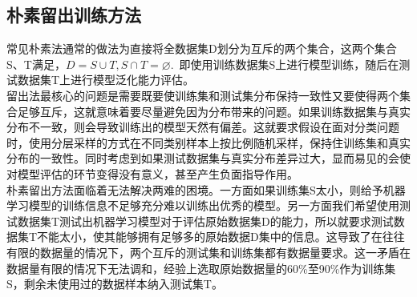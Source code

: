  \subsection{朴素留出训练方法}
 \indent 常见朴素法通常的做法为直接将全数据集D划分为互斥的两个集合，这两个集合S、T满足，$D=S \cup T, S \cap T=\varnothing$.~即使用训练数据集S上进行模型训练，随后在测试数据集T上进行模型泛化能力评估。\\
 \indent 留出法最核心的问题是需要既要使训练集和测试集分布保持一致性又要使得两个集合足够互斥，这就意味着要尽量避免因为分布带来的问题。如果训练数据集与真实分布不一致，则会导致训练出的模型天然有偏差。这就要求假设在面对分类问题时，使用分层采样的方式在不同类别样本上按比例随机采样，保持住训练集和真实分布的一致性。同时考虑到如果测试数据集与真实分布差异过大，显而易见的会使对模型评估的环节变得没有意义，甚至产生负面指导作用。\\
 \indent 朴素留出方法面临着无法解决两难的困境。一方面如果训练集S太小，则给予机器学习模型的训练信息不足够充分难以训练出优秀的模型。另一方面我们希望使用测试数据集T测试出机器学习模型对于评估原始数据集D的能力，所以就要求测试数据集T不能太小，使其能够拥有足够多的原始数据D集中的信息。这导致了在往往有限的数据量的情况下，两个互斥的测试集和训练集都有数据量要求。这一矛盾在数据量有限的情况下无法调和，经验上选取原始数据量的60\%至90\%作为训练集S，剩余未使用过的数据样本纳入测试集T。\\
